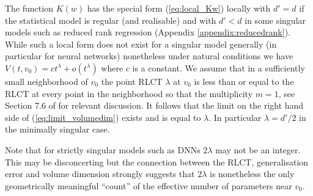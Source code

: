 \documentclass{article} %
\begin{document}
The function $K(w)$ has the special form (\ref{eq:local_Kw}) locally with $d' = d$ if the statistical model is regular (and realisable) and with $d' < d$ in some singular models such as reduced rank regression (Appendix \ref{appendix:reducedrank}). While such a local form does not exist for a singular model generally (in particular for neural networks) nonetheless under natural conditions \citep[Theorem 7.1]{watanabe_algebraic_2009} we have
$
V(t,v_0) = c t^\lambda + o( t^\lambda)
$
where $c$ is a constant. We assume that in a sufficiently small neighborhood of $v_0$ the point RLCT $\lambda$ at $v_0$ \citep[Definition 2.7]{watanabe_algebraic_2009} is less than or equal to the RLCT at every point in the neighborhood so that the multiplicity $m = 1$, see Section 7.6 of \citep{watanabe_algebraic_2009} for relevant discussion.
It follows that the limit on the right hand side of  (\ref{eq:limit_volumedim}) exists and is equal to $\lambda$. In particular $\lambda = d'/2$ in the minimally singular case.

Note that for strictly singular models such as DNNs $2 \lambda$ may not be an integer. This may be disconcerting but the connection between the RLCT, generalisation error and volume dimension strongly suggests that $2 \lambda$ is nonetheless the only geometrically meaningful ``count'' of the effective number of parameters near $v_0$. 
\end{document}
